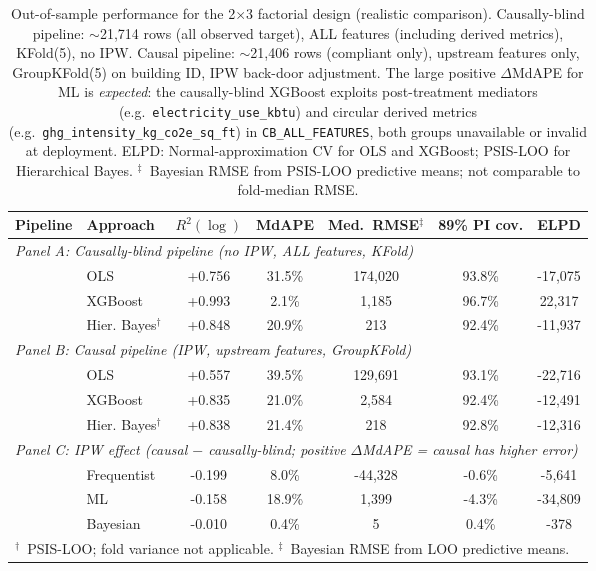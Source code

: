 \begin{table}[ht]
\centering
\setlength{\tabcolsep}{6pt}
\small
\caption{Out-of-sample performance for the 2$\times$3 factorial design (realistic comparison). Causally-blind pipeline: $\sim$21{,}714 rows (all observed target), ALL features (including derived metrics), KFold(5), no IPW. Causal pipeline: $\sim$21{,}406 rows (compliant only), upstream features only, GroupKFold(5) on building ID, IPW back-door adjustment. The large positive $\Delta$MdAPE for ML is \emph{expected}: the causally-blind XGBoost exploits post-treatment mediators (e.g.\ \texttt{electricity\_use\_kbtu}) and circular derived metrics (e.g.\ \texttt{ghg\_intensity\_kg\_co2e\_sq\_ft}) in \texttt{CB\_ALL\_FEATURES}, both groups unavailable or invalid at deployment. ELPD: Normal-approximation CV for OLS and XGBoost; PSIS-LOO for Hierarchical Bayes. $^{\ddagger}$~Bayesian RMSE from PSIS-LOO predictive means; not comparable to fold-median RMSE.}
\label{tab:model_comparison}
\begin{tabular}{llccccc}
\toprule
Pipeline & Approach & $R^2(\log)$ & MdAPE & Med.\ RMSE$^{\ddagger}$ & 89\% PI cov. & ELPD \\
\midrule
\multicolumn{7}{l}{\textit{Panel A: Causally-blind pipeline (no IPW, ALL features, KFold)}} \\
\midrule
& OLS & +0.756 & 31.5\% & 174,020 & 93.8\% & -17,075 \\
& XGBoost & +0.993 & 2.1\% & 1,185 & 96.7\% & 22,317 \\
& Hier. Bayes$^{\dagger}$ & +0.848 & 20.9\% & 213 & 92.4\% & -11,937 \\
\midrule
\multicolumn{7}{l}{\textit{Panel B: Causal pipeline (IPW, upstream features, GroupKFold)}} \\
\midrule
& OLS & +0.557 & 39.5\% & 129,691 & 93.1\% & -22,716 \\
& XGBoost & +0.835 & 21.0\% & 2,584 & 92.4\% & -12,491 \\
& Hier. Bayes$^{\dagger}$ & +0.838 & 21.4\% & 218 & 92.8\% & -12,316 \\
\midrule
\multicolumn{7}{l}{\textit{Panel C: IPW effect (causal $-$ causally-blind; positive $\Delta$MdAPE = causal has higher error)}} \\
\midrule
& Frequentist & -0.199 & 8.0\% & -44,328 & -0.6\% & -5,641 \\
& ML & -0.158 & 18.9\% & 1,399 & -4.3\% & -34,809 \\
& Bayesian & -0.010 & 0.4\% & 5 & 0.4\% & -378 \\
\bottomrule
\multicolumn{7}{l}{\footnotesize $^{\dagger}$~PSIS-LOO; fold variance not applicable. $^{\ddagger}$~Bayesian RMSE from LOO predictive means.} \\
\end{tabular}
\end{table}